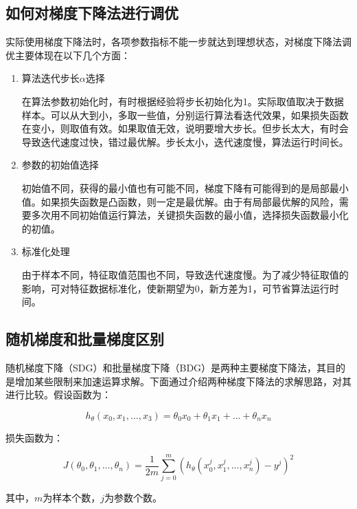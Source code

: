 \subsection{如何对梯度下降法进行调优}

实际使用梯度下降法时，各项参数指标不能一步就达到理想状态，对梯度下降法调优主要体现在以下几个方面：

\begin{enumerate}
\itemsep0em
\item 算法迭代步长$\alpha$选择

	在算法参数初始化时，有时根据经验将步长初始化为1。实际取值取决于数据样本。可以从大到小，多取一些值，分别运行算法看迭代效果，如果损失函数在变小，则取值有效。如果取值无效，说明要增大步长。但步长太大，有时会导致迭代速度过快，错过最优解。步长太小，迭代速度慢，算法运行时间长。

\item 参数的初始值选择

	初始值不同，获得的最小值也有可能不同，梯度下降有可能得到的是局部最小值。如果损失函数是凸函数，则一定是最优解。由于有局部最优解的风险，需要多次用不同初始值运行算法，关键损失函数的最小值，选择损失函数最小化的初值。

\item 标准化处理

	由于样本不同，特征取值范围也不同，导致迭代速度慢。为了减少特征取值的影响，可对特征数据标准化，使新期望为0，新方差为1，可节省算法运行时间。
\end{enumerate}

\subsection{随机梯度和批量梯度区别}

随机梯度下降（SDG）和批量梯度下降（BDG）是两种主要梯度下降法，其目的是增加某些限制来加速运算求解。下面通过介绍两种梯度下降法的求解思路，对其进行比较。假设函数为：

$$
h_\theta (x_0,x_1,...,x_3) = \theta_0 x_0 + \theta_1 x_1 + ... + \theta_n x_n
$$

损失函数为：

$$
J(\theta_0, \theta_1, ... , \theta_n) =
			\frac{1}{2m} \sum^{m}_{j=0}(h_\theta (x^{j}_0
	,x^{j}_1,...,x^{j}_n)-y^j)^2
$$

其中，$m$为样本个数，$j$为参数个数。

